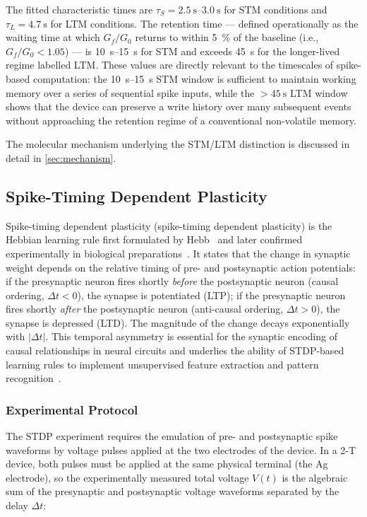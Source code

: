 \documentclass[12pt, a4paper, twoside]{report}
\newcommand{\STDP}{spike-timing dependent plasticity}
\begin{document}
The fitted characteristic times are $\tau_S = \SIrange{2.5}{3.0}{\second}$ for STM conditions and $\tau_L = \SI{4.7}{\second}$ for LTM conditions. The retention time — defined operationally as the waiting time at which $G_f/G_0$ returns to within \SI{5}{\percent} of the baseline (i.e., $G_f/G_0 < 1.05$) — is \SIrange{10}{15}{\second} for STM and exceeds \SI{45}{\second} for the longer-lived regime labelled LTM. These values are directly relevant to the timescales of spike-based computation: the \SIrange{10}{15}{\second} STM window is sufficient to maintain working memory over a series of sequential spike inputs, while the $> \SI{45}{\second}$ LTM window shows that the device can preserve a write history over many subsequent events without approaching the retention regime of a conventional non-volatile memory.

The molecular mechanism underlying the STM/LTM distinction is discussed in detail in \cref{sec:mechanism}.

\subsection{Spike-Timing Dependent Plasticity}\label{subsec:stdp}

Spike-timing dependent plasticity (\STDP{}) is the Hebbian learning rule first formulated by Hebb~\cite{Hebb1949} and later confirmed experimentally in biological preparations~\cite{Bi1998, Bliss1973}. It states that the change in synaptic weight depends on the relative timing of pre- and postsynaptic action potentials: if the presynaptic neuron fires shortly \textit{before} the postsynaptic neuron (causal ordering, $\Delta t < 0$), the synapse is potentiated (LTP); if the presynaptic neuron fires shortly \textit{after} the postsynaptic neuron (anti-causal ordering, $\Delta t > 0$), the synapse is depressed (LTD). The magnitude of the change decays exponentially with $|\Delta t|$. This temporal asymmetry is essential for the synaptic encoding of causal relationships in neural circuits and underlies the ability of STDP-based learning rules to implement unsupervised feature extraction and pattern recognition~\cite{Bichler2012}.

\subsubsection{Experimental Protocol}

The STDP experiment requires the emulation of pre- and postsynaptic spike waveforms by voltage pulses applied at the two electrodes of the device. In a 2-T device, both pulses must be applied at the same physical terminal (the Ag electrode), so the experimentally measured total voltage $V(t)$ is the algebraic sum of the presynaptic and postsynaptic voltage waveforms separated by the delay $\Delta t$:
\end{document}
